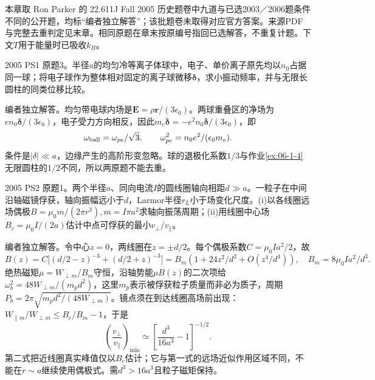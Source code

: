 本章取 Ron Parker 的 22.611J Fall 2005 历史题卷中九道与已选2003／2006题条件不同的公开题，均标“编者独立解答”；该批题卷未取得对应官方答案。来源PDF与完整去重判定见末章。相同原题在章末按原编号指回已选解答，不重复计题。下文$T$用于能量时已吸收$k_B$。

\begin{exercise}\label{ex:hist05-1-3}
2005 PS1 原题3。半径$a$的均匀冷等离子体球中，电子、单价离子原先均以$n_0$占据同一球；将电子球作为整体相对固定的离子球微移$\boldsymbol\delta$，求小振动频率，并与无限长圆柱的同类位移比较。
\end{exercise}
\begin{solution}
编者独立解答。均匀带电球内场是$\mathbf E=\rho\mathbf r/(3\epsilon_0)$。两球重叠区的净场为$en_0\boldsymbol\delta/(3\epsilon_0)$，电子受力方向相反，因此$m_e\ddot{\boldsymbol\delta}=-e^2n_0\boldsymbol\delta/(3\epsilon_0)$，即
\begin{equation}\omega_{\rm ball}=\omega_{pe}/\sqrt3,\qquad \omega_{pe}^2=n_0e^2/(\epsilon_0m_e).\end{equation}
条件是$|\delta|\ll a$，边缘产生的高阶形变忽略。球的退极化系数$1/3$与作业\ref{ex:06-1-4}无限圆柱的$1/2$不同，所以两原题不能去重。
\end{solution}

\begin{exercise}\label{ex:hist05-2-1}
2005 PS2 原题1。两个半径$a$、同向电流$I$的圆线圈轴向相距$d\gg a$。一粒子在中间沿轴磁镜俘获，轴向振幅远小于$d$，Larmor半径$r_L$小于场变化尺度。(i)以各线圈远场偶极$B=\mu_0m/(2\pi r^3),m=I\pi a^2$求轴向振荡周期；(ii)用线圈中心场$B_c=\mu_0I/(2a)$估计中点可俘获的最小$v_\perp/v_\parallel$。
\end{exercise}
\begin{solution}
编者独立解答。令中心$z=0$，两线圈在$z=\pm d/2$。每个偶极系数$C=\mu_0Ia^2/2$，故
\begin{equation}
B(z)=C\bigl[(d/2-z)^{-3}+(d/2+z)^{-3}\bigr]
=B_m\left(1+24z^2/d^2+O(z^4/d^4)\right),\quad B_m=8\mu_0Ia^2/d^3.
\end{equation}
绝热磁矩$\mu=W_{\perp m}/B_m$守恒，沿轴势能$\mu B(z)$的二次项给$\omega_b^2=48W_{\perp m}/(m_pd^2)$，这里$m_p$表示被俘获粒子质量而非必为质子，周期$P_b=2\pi\sqrt{m_pd^2/(48W_{\perp m})}$。镜点须在到达线圈高场前出现：$W_{\parallel m}/W_{\perp m}\le B_c/B_m-1$，于是
\begin{equation}\left(\frac{v_\perp}{v_\parallel}\right)_{\min}\simeq\left[\frac{d^3}{16a^3}-1\right]^{-1/2}.\end{equation}
第二式把近线圈真实峰值仅以$B_c$估计；它与第一式的远场近似作用区域不同，不能在$r\sim a$继续使用偶极式。需$d^3>16a^3$且粒子磁矩保持。
\end{solution}

